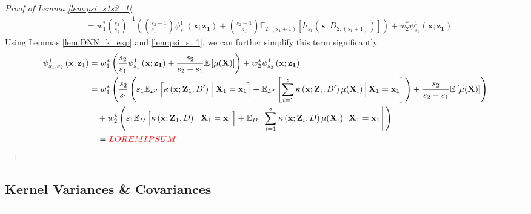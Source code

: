 \documentclass[letterpaper,10pt]{article}
\numberwithin{equation}{section}
\numberwithin{thm}{section}
\numberwithin{lem}{section}
\numberwithin{cor}{section}
\newcommand{\E}{\mathbb{E}}
\newcommand{\1}{\mathbbm{1}}
\begin{document}
\begin{proof}[Proof of Lemma \ref{lem:psi_s1s2_1}]
\begin{equation}
\begin{aligned}
			 & = w_{1}^{*} \binom{s_2}{s_1}^{-1}\left(
			\binom{s_2-1}{s_1-1}\psi_{s_1}^{1}\left(\mathbf{x}; \mathbf{z_1}\right)
			+ \binom{s_2-1}{s_1}\E_{2:(s_1+1)}\left[h_{s_1}\left(\mathbf{x}; D_{2:(s_1+1)}\right)\right]
			\right) + w_{2}^{*} \psi_{s_2}^{1}\left(\mathbf{x}; \mathbf{z_1}\right)
		\end{aligned}
	\end{equation}
	Using Lemmas \ref{lem:DNN_k_exp} and \ref{lem:psi_s_1}, we can further simplify this term significantly.
	\begin{equation}
		\begin{aligned}
			\psi_{s_1, s_2}^{1}\left(\mathbf{x}; \mathbf{z}_1\right)
			 & = w_{1}^{*} \left(\frac{s_2}{s_1}\psi_{s_1}^{1}\left(\mathbf{x}; \mathbf{z_1}\right)
			+ \frac{s_2}{s_2 - s_1}\E\left[\mu(\mathbf{X})\right]\right)
			+ w_{2}^{*} \psi_{s_2}^{1}\left(\mathbf{x}; \mathbf{z_1}\right)                                                                                       \\
			 & = w_{1}^{*} \left(
			\frac{s_2}{s_1}\left(\varepsilon_1 \E_{D'}\left[\kappa\left(\mathbf{x}; \mathbf{Z}_1, D'\right)\, \Big| \, \mathbf{X}_1 = \mathbf{x}_1 \right]
				+ \E_{D'}\left[\sum_{i = 1}^{s} \kappa\left(\mathbf{x}; \mathbf{Z}_i, D'\right) \mu(\mathbf{X}_i)\, \Big| \, \mathbf{X}_1 = \mathbf{x}_1 \right]\right)
			+ \frac{s_2}{s_2 - s_1}\E\left[\mu(\mathbf{X})\right]\right)                                                                                          \\
			 & \quad + w_{2}^{*} \left(\varepsilon_1 \E_D\left[\kappa\left(\mathbf{x}; \mathbf{Z}_1, D\right)\, \Big| \, \mathbf{X}_1 = \mathbf{x}_1 \right]
			+ \E_{D}\left[\sum_{i = 1}^{s} \kappa\left(\mathbf{x}; \mathbf{Z}_i, D\right) \mu(\mathbf{X}_i)\, \Big| \, \mathbf{X}_1 = \mathbf{x}_1 \right]\right) \\
			 & \quad = {\color{red} LOREM IPSUM}
		\end{aligned}
	\end{equation}
\end{proof}

\newpage
\subsection{Kernel Variances \& Covariances}
\hrule
\end{document}
